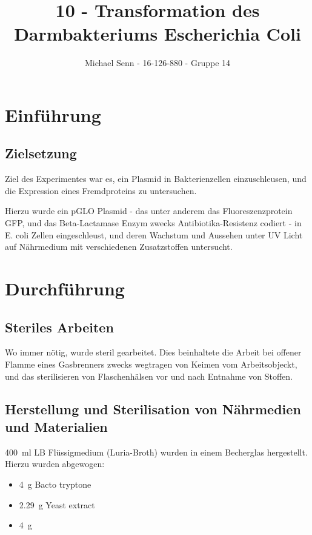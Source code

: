 \documentclass[a4paper,english]{scrreprt}
\title{10 - Transformation des Darmbakteriums Escherichia Coli}
\author{Michael Senn \maillink{michael.senn@students.unibe.ch} - 16-126-880 - Gruppe 14}
\date{\printdate}
\begin{document}
\maketitle

\chapter{Einführung}

\section{Zielsetzung}

Ziel des Experimentes war es, ein Plasmid in Bakterienzellen einzuschleusen,
und die Expression eines Fremdproteins zu untersuchen.

Hierzu wurde ein pGLO Plasmid - das unter anderem das Fluoreszenzprotein GFP,
und das Beta-Lactamase Enzym zwecks Antibiotika-Resistenz codiert - in E. coli
Zellen eingeschleust, und deren Wachstum und Aussehen unter UV Licht auf
Nährmedium mit verschiedenen Zusatzstoffen untersucht.

\chapter{Durchführung\cite{skriptv10}}

\section{Steriles Arbeiten}

Wo immer nötig, wurde steril gearbeitet. Dies beinhaltete die Arbeit bei
offener Flamme eines Gasbrenners zwecks wegtragen von Keimen vom
Arbeitsobjeckt, und das sterilisieren von Flaschenhälsen vor und nach Entnahme
von Stoffen.

\section{Herstellung und Sterilisation von Nährmedien und Materialien}

\SI{400}{\ml} LB Flüssigmedium (Luria-Broth) wurden in einem Becherglas
hergestellt. Hierzu wurden abgewogen:

\begin{itemize}
	\item \SI{4}{\g} Bacto tryptone
	\item \SI{2.29}{\g} Yeast extract
	\item \SI{4}{\g} 
\end{itemize}
\end{document}
